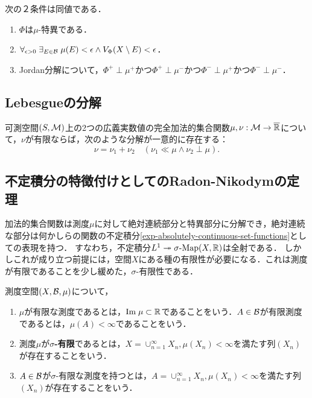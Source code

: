 \documentclass[uplatex, dvipdfmx]{jsreport}
\begin{document}
\begin{theorem}
    次の２条件は同値である．
    \begin{enumerate}
        \item $\Phi$は$\mu$-特異である．
        \item $\forall_{\epsilon>0}\;\exists_{E\in\mathcal{B}}\;\mu(E)<\epsilon\land V_\Phi(X\setminus E)<\epsilon$．
        \item Jordan分解について，$\Phi^+\perp\mu^+$かつ$\Phi^+\perp\mu^-$かつ$\Phi^-\perp\mu^+$かつ$\Phi^-\perp\mu^-$．
    \end{enumerate}
\end{theorem}

\subsection{Lebesgueの分解}

\begin{theorem}
    可測空間$(S,\mathcal{M})$上の2つの広義実数値の完全加法的集合関数$\mu,\nu:\mathcal{M}\to\overline{\mathbb{R}}$について，$\nu$が有限ならば，次のような分解が一意的に存在する：
    \[\nu=\nu_1+\nu_2\quad(\nu_1\ll\mu\land\nu_2\perp\mu).\]
\end{theorem}

\subsection{不定積分の特徴付けとしてのRadon-Nikodymの定理}

\begin{tcolorbox}[colframe=ForestGreen, colback=ForestGreen!10!white,breakable,colbacktitle=ForestGreen!40!white,coltitle=black,fonttitle=\bfseries\sffamily,
title=]
    加法的集合関数は測度$\mu$に対して絶対連続部分と特異部分に分解でき，絶対連続な部分は何かしらの関数の不定積分\ref{exp-absolutely-continuous-set-functions}としての表現を持つ．
    すなわち，不定積分$L^1\twoheadrightarrow\sigma\textrm{-}\mathrm{Map}(X,\mathbb{R})$は全射である．
    しかしこれが成り立つ前提には，空間$X$にある種の有限性が必要になる．これは測度が有限であることを少し緩めた，$\sigma$-有限性である．
\end{tcolorbox}

\begin{definition}
    測度空間$(X,\mathcal{B},\mu)$について，
    \begin{enumerate}
        \item $\mu$が有限な測度であるとは，$\mathrm{Im}\;\mu\subset\mathbb{R}$であることをいう．$A\in\mathcal{B}$が有限測度であるとは，$\mu(A)<\infty$であることをいう．
        \item 測度$\mu$が\textbf{$\sigma$-有限}であるとは，$X=\cup^\infty_{n=1}X_n,\mu(X_n)<\infty$を満たす列$(X_n)$が存在することをいう．
        \item $A\in\mathcal{B}$が$\sigma$-有限な測度を持つとは，$A=\cup^\infty_{n=1}X_n,\mu(X_n)<\infty$を満たす列$(X_n)$が存在することをいう．
    \end{enumerate}
\end{definition}
\end{document}
